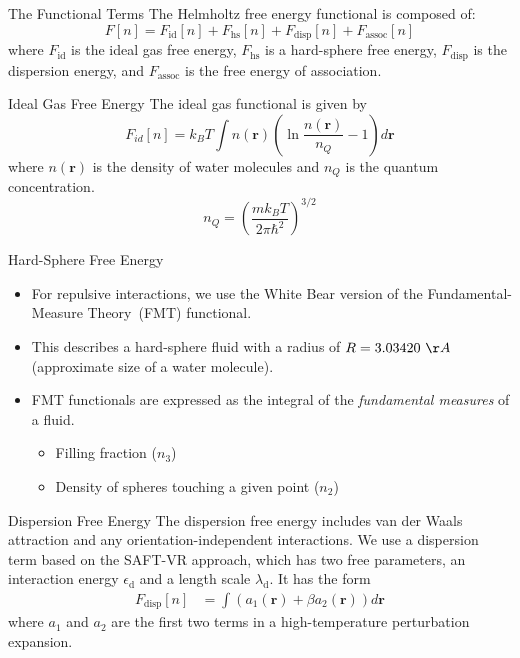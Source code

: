 \documentclass{beamer}
\newcommand{\xx}{\textbf{r}}
\begin{document}
\begin{frame}[fragile]{The Functional Terms}
The Helmholtz free energy functional is composed of:
\begin{equation}
  F[n] = F_\text{id}[n] + F_\text{hs}[n] + F_\text{disp}[n] + F_\text{assoc}[n] 
\end{equation}
where $F_\text{id}$ is the ideal gas free energy, $F_\text{hs}$ is
a hard-sphere free energy, $F_\text{disp}$ is the dispersion energy, and 
$F_\text{assoc}$ is the free energy of
association.
\end{frame}

\begin{frame}[fragile]{Ideal Gas Free Energy}
The ideal gas functional is given by
\begin{equation}
  F_{id}[n] = k_B T \int n(\xx)\left( \ln{\frac{n(\xx)}{n_Q}} - 1\right) d\xx
\end{equation}
where $n(\xx)$ is the density of water molecules and $n_Q$ is the
quantum concentration.
\begin{equation}
 n_Q =\left(\frac{mk_BT}{2\pi\hbar^2}\right)^{3/2}
\end{equation}
\end{frame}

\begin{frame}[fragile]{Hard-Sphere Free Energy}
\begin{itemize}
 \item <1-> For repulsive interactions, we use the White Bear version of
the Fundamental-Measure Theory~(FMT) functional.
 \vspace{0.5cm}
 \item <2-> This describes a hard-sphere fluid with a radius of $R=3.03420~\AA$
  (approximate size of a water molecule).
 \vspace{0.5cm}
 \item <3-> FMT functionals are expressed as the integral of
the \emph{fundamental measures} of a fluid.
  \begin{itemize}
    \item <4-> Filling fraction ($n_3$)
    \item <5-> Density of spheres touching a given point  ($n_2$)
  \end{itemize}
\end{itemize}
\end{frame}
 
\begin{frame}[fragile]{Dispersion Free Energy}
The dispersion free energy includes van der Waals attraction and 
any orientation-independent interactions. We use a
dispersion term based on the SAFT-VR approach, which has two free
parameters, an interaction energy $\epsilon_\text{d}$ and a 
length scale $\lambda_\text{d}$. It has the form
\begin{align}
  F_\text{disp}[n] &= \int (a_1(\xx) + \beta a_2(\xx))d\xx 
\end{align}
where $a_1$ and $a_2$ are the first two terms in a high-temperature
perturbation expansion.
\end{frame}
\end{document}
